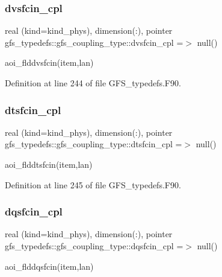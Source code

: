 \subsubsection{dvsfcin\+\_\+cpl}
{\footnotesize\ttfamily real (kind=kind\+\_\+phys), dimension(\+:), pointer gfs\+\_\+typedefs\+::gfs\+\_\+coupling\+\_\+type\+::dvsfcin\+\_\+cpl =$>$ null()}



aoi\+\_\+flddvsfcin(item,lan) 



Definition at line 244 of file G\+F\+S\+\_\+typedefs.\+F90.

\mbox{\label{structgfs__typedefs_1_1gfs__coupling__type_a9c88f4e5114fb1ae3bd49940265e085d}} 
\subsubsection{dtsfcin\+\_\+cpl}
{\footnotesize\ttfamily real (kind=kind\+\_\+phys), dimension(\+:), pointer gfs\+\_\+typedefs\+::gfs\+\_\+coupling\+\_\+type\+::dtsfcin\+\_\+cpl =$>$ null()}



aoi\+\_\+flddtsfcin(item,lan) 



Definition at line 245 of file G\+F\+S\+\_\+typedefs.\+F90.

\mbox{\label{structgfs__typedefs_1_1gfs__coupling__type_a354f3edf79ca55fd16093b5bb5137c7f}} 
\subsubsection{dqsfcin\+\_\+cpl}
{\footnotesize\ttfamily real (kind=kind\+\_\+phys), dimension(\+:), pointer gfs\+\_\+typedefs\+::gfs\+\_\+coupling\+\_\+type\+::dqsfcin\+\_\+cpl =$>$ null()}



aoi\+\_\+flddqsfcin(item,lan) 



